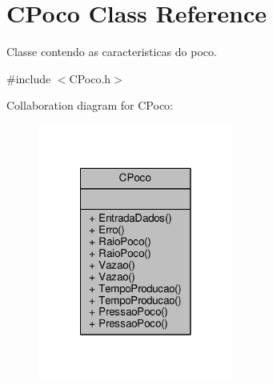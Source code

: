 \hypertarget{classCPoco}{\section{C\-Poco Class Reference}
\label{classCPoco}
}


Classe contendo as caracteristicas do poco.  




{\ttfamily \#include $<$C\-Poco.\-h$>$}



Collaboration diagram for C\-Poco\-:
\nopagebreak
\begin{figure}[H]
\begin{center}
\leavevmode
\includegraphics[width=182pt]{classCPoco__coll__graph}
\end{center}
\end{figure}
